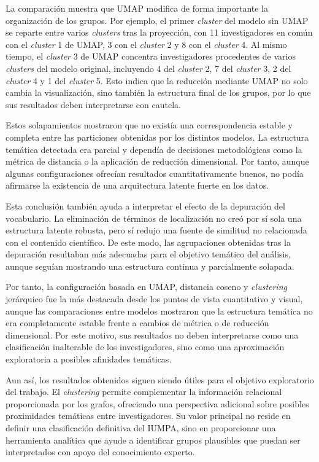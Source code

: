 \documentclass[11pt,spanish,listoffigures,listoftables]{tfgetsinf}
\begin{document}
La comparación muestra que UMAP modifica de forma importante la organización de los grupos. Por ejemplo, el primer \textit{cluster} del modelo sin UMAP se reparte entre varios \textit{clusters} tras la proyección, con 11 investigadores en común con el \textit{cluster} 1 de UMAP, 3 con el \textit{cluster} 2 y 8 con el \textit{cluster} 4. Al mismo tiempo, el \textit{cluster} 3 de UMAP concentra investigadores procedentes de varios \textit{clusters} del modelo original, incluyendo 4 del \textit{cluster} 2, 7 del \textit{cluster} 3, 2 del \textit{cluster} 4 y 1 del \textit{cluster} 5. Esto indica que la reducción mediante UMAP no solo cambia la visualización, sino también la estructura final de los grupos, por lo que sus resultados deben interpretarse con cautela.

Estos solapamientos mostraron que no existía una correspondencia estable y completa entre las particiones obtenidas por los distintos modelos. La estructura temática detectada era parcial y dependía de decisiones metodológicas como la métrica de distancia o la aplicación de reducción dimensional. Por tanto, aunque algunas configuraciones ofrecían resultados cuantitativamente buenos, no podía afirmarse la existencia de una arquitectura latente fuerte en los datos.

Esta conclusión también ayuda a interpretar el efecto de la depuración del vocabulario. La eliminación de términos de localización no creó por sí sola una estructura latente robusta, pero sí redujo una fuente de similitud no relacionada con el contenido científico. De este modo, las agrupaciones obtenidas tras la depuración resultaban más adecuadas para el objetivo temático del análisis, aunque seguían mostrando una estructura continua y parcialmente solapada.

Por tanto, la configuración basada en UMAP, distancia coseno y \textit{clustering} jerárquico fue la más destacada desde los puntos de vista cuantitativo y visual, aunque las comparaciones entre modelos mostraron que la estructura temática no era completamente estable frente a cambios de métrica o de reducción dimensional. Por este motivo, sus resultados no deben interpretarse como una clasificación inalterable de los investigadores, sino como una aproximación exploratoria a posibles afinidades temáticas.

Aun así, los resultados obtenidos siguen siendo útiles para el objetivo exploratorio del trabajo. El \textit{clustering} permite complementar la información relacional proporcionada por los grafos, ofreciendo una perspectiva adicional sobre posibles proximidades temáticas entre investigadores. Su valor principal no reside en definir una clasificación definitiva del IUMPA, sino en proporcionar una herramienta analítica que ayude a identificar grupos plausibles que puedan ser interpretados con apoyo del conocimiento experto.
\end{document}
